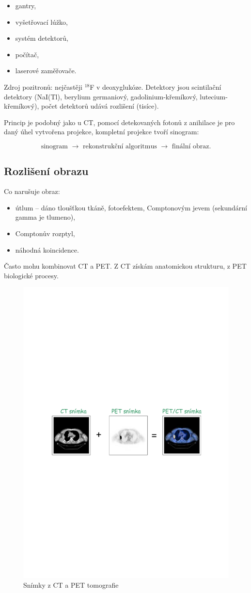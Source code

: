 \begin{itemize}
    \item gantry, 
    \item vyšetřovací lúžko,
    \item systém detektorů, 
    \item počítač,
    \item laserové zaměřovače.
\end{itemize}

Zdroj pozitronů: nejčastěji $^{18}$F v deoxyglukóze. Detektory jsou scintilační detektory (NaI(Tl), berylium germaniový, gadolinium-křemíkový, lutecium-křemíkový), počet detektorů udává rozlišení (tisíce). 

Princip je podobný jako u CT, pomocí detekovaných fotonů z anihilace je pro daný úhel vytvořena projekce, kompletní projekce tvoří sinogram:

$$ \text{sinogram $\rightarrow$ rekonstrukční algoritmus $\rightarrow$ finální obraz.} $$

\subsection{Rozlišení obrazu}

Co narušuje obraz:

\begin{itemize}
    \item útlum -- dáno tloušťkou tkáně, fotoefektem, Comptonovým jevem (sekundární gamma je tlumeno),
    \item Comptonův rozptyl,
    \item náhodná koincidence.
\end{itemize}

Často mohu kombinovat CT a PET. Z CT získám anatomickou strukturu, z PET biologické procesy.


\begin{figure}[H]
    \centering
    \includegraphics[width=0.8\linewidth, trim={1cm 11cm 1cm 11cm}, clip]{img/pet_obrazy.pdf}
    \caption{Snímky z CT a PET tomografie}
    \label{fig:2_6_CT_PET_tomografie}
\end{figure}